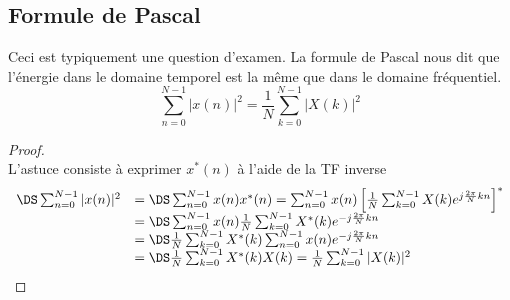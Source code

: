 	\subsection{Formule de Pascal}
	Ceci est typiquement une question d'examen. La formule de Pascal nous dit que l'énergie dans 
	le domaine temporel est la même que dans le domaine fréquentiel. 
	\begin{equation}
	\sum_{n=0}^{N-1} |x(n)|^2 = \frac{1}{N}\sum_{k=0}^{N-1} |X(k)|^2
	\end{equation}
	\begin{proof}\ \\
	L'astuce consiste à exprimer $x^*(n)$ à l'aide de la TF inverse
	\begin{equation}
	\begin{array}{ll}
	\DS\sum_{n=0}^{N-1} |x(n)|^2 &= \DS\sum_{n=0}^{N-1}x(n)x^*(n) = \sum_{n=0}^{N-1}x(n)\left[
	\frac{1}{N}	\sum_{k=0}^{N-1}X(k)e^{j\frac{2\pi}{N}kn}\right]^*\\
	&=\DS \sum_{n=0}^{N-1}x(n)\frac{1}{N}\sum_{k=0}^{N-1}X^*(k)e^{-j\frac{2\pi}{N}kn}\\
	&=\DS \frac{1}{N}\sum_{k=0}^{N-1}X^*(k)\sum_{n=0}^{N-1}x(n)e^{-j\frac{2\pi}{N}kn}\\
	&=\DS\frac{1}{N}\sum_{k=0}^{N-1}X^*(k)X(k) = \frac{1}{N}\sum_{k=0}^{N-1} |X(k)|^2
	\end{array}
	\end{equation}
	\end{proof}
	
